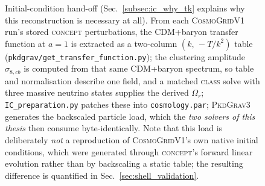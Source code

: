 \documentclass{report}
\begin{document}
\begin{figure}[h!]
\centering
{}
\caption{Initial-condition hand-off (Sec.~\ref{subsec:ic_why_tk} explains why this reconstruction is necessary at all). From each \textsc{CosmoGridV1} run's stored \textsc{concept} perturbations, the CDM+baryon transfer function at $a=1$ is extracted as a two-column $(k,\,-T/k^2)$ table (\texttt{pkdgrav/get\_transfer\_function.py}); the clustering amplitude \mbox{$\sigma_{8,cb}$} is computed from that same CDM+baryon spectrum, so table and normalisation describe one field, and a matched \textsc{class} solve with three massive neutrino states supplies the derived \mbox{$\Omega_r$}; \texttt{IC\_preparation.py} patches these into \texttt{cosmology.par}; \textsc{PkdGrav3} generates the backscaled particle load, which the \emph{two solvers of this thesis} then consume byte-identically. Note that this load is deliberately \emph{not} a reproduction of \textsc{CosmoGridV1}'s own native initial conditions, which were generated through \textsc{concept}'s forward linear evolution rather than by backscaling a static table; the resulting difference is quantified in Sec.~\ref{sec:shell_validation}.}
\label{fig:ic_flow}
\end{figure}
\end{document}
